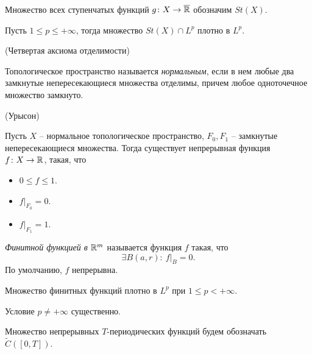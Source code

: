 \begin{definition}
    Множество всех ступенчатых функций $g \colon X \to \overline{\mathbb{R}}$
    обозначим $St(X)$.
\end{definition}

\begin{lemma}
    Пусть $1 \leqslant p \leqslant +\infty$, тогда множество
    $St(X) \cap L^p$ плотно в $L^p$.
\end{lemma}

\begin{definition}(Четвертая аксиома отделимости)
    
    Топологическое пространство называется \textit{нормальным},
    если в нем любые два замкнутые непересекающиеся множества
    отделимы, причем любое одноточечное множество замкнуто.
\end{definition}

\begin{lemma}(Урысон)
    
    Пусть $X$ -- нормальное топологическое пространство, 
    $F_0, F_1$ -- замкнутые непересекающиеся множества. Тогда
    существует непрерывная функция $f \colon X \to \mathbb{R}$, такая, что
    \begin{itemize}
        \item $0 \leqslant f \leqslant 1$.
        \item $f\big|_{F_0} = 0$.
        \item $f\big|_{F_1} = 1$.
    \end{itemize} 
\end{lemma}

\begin{definition}
    \textit{Финитной функцией в $\mathbb{R}^m$} называется функция $f$ такая, что
\[
    \exists B(a, r)\colon~ f\big|_B = 0
.\] 
    По умолчанию, $f$ непрерывна.
\end{definition}

\begin{theorem}
    Множество финитных функций плотно в $L^p$ при $1 \leqslant p < +\infty$.
\end{theorem}

\begin{remark}
    Условие $p \neq +\infty$ существенно.
\end{remark}

\begin{definition}
    Множество непрерывных $T$-периодических функций будем обозначать $\widetilde{C}([0, T])$.
\end{definition}

